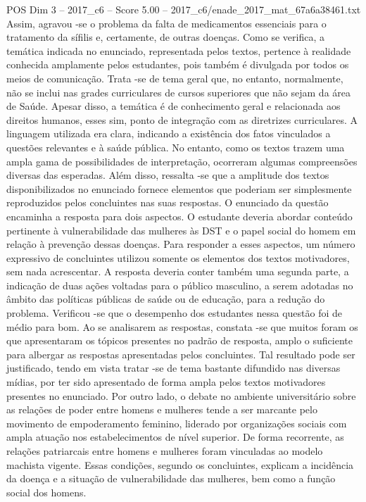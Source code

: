 \begin{textsample}{POS Dim 3 – 2017\_c6 – Score 5.00 – 2017\_c6/enade\_2017\_mat\_67a6a38461.txt}
Assim, agravou -se o problema da falta de medicamentos essenciais para o tratamento da sífilis e, certamente, de outras doenças.
Como se verifica, a temática indicada no enunciado, representada pelos textos, pertence à realidade conhecida amplamente pelos estudantes, pois também é divulgada por todos os meios de comunicação.
Trata -se de tema geral que, no entanto, normalmente, não se inclui nas grades curriculares de cursos superiores que não sejam da área de Saúde.
Apesar disso, a temática é de conhecimento geral e relacionada aos direitos humanos, esses sim, ponto de integração com as diretrizes curriculares.
A linguagem utilizada era clara, indicando a existência dos fatos vinculados a questões relevantes e à saúde pública.
No entanto, como os textos trazem uma ampla gama de possibilidades de interpretação, ocorreram algumas compreensões diversas das esperadas.
Além disso, ressalta -se que a amplitude dos textos disponibilizados no enunciado fornece elementos que poderiam ser simplesmente reproduzidos pelos concluintes nas suas respostas.
O enunciado da questão encaminha a resposta para dois aspectos.
O estudante deveria abordar conteúdo pertinente à vulnerabilidade das mulheres às DST e o papel social do homem em relação à prevenção dessas doenças.
Para responder a esses aspectos, um número expressivo de concluintes utilizou somente os elementos dos textos motivadores, sem nada acrescentar.
A resposta deveria conter também uma segunda parte, a indicação de duas ações voltadas para o público masculino, a serem adotadas no âmbito das políticas públicas de saúde ou de educação, para a redução do problema.
Verificou -se que o desempenho dos estudantes nessa questão foi de médio para bom.
Ao se analisarem as respostas, constata -se que muitos foram os que apresentaram os tópicos presentes no padrão de resposta, amplo o suficiente para albergar as respostas apresentadas pelos concluintes.
Tal resultado pode ser justificado, tendo em vista tratar -se de tema bastante difundido nas diversas mídias, por ter sido apresentado de forma ampla pelos textos motivadores presentes no enunciado.
Por outro lado, o debate no ambiente universitário sobre as relações de poder entre homens e mulheres tende a ser marcante pelo movimento de empoderamento feminino, liderado por organizações sociais com ampla atuação nos estabelecimentos de nível superior.
De forma recorrente, as relações patriarcais entre homens e mulheres foram vinculadas ao modelo machista vigente.
Essas condições, segundo os concluintes, explicam a incidência da doença e a situação de vulnerabilidade das mulheres, bem como a função social dos homens.

\end{textsample}
